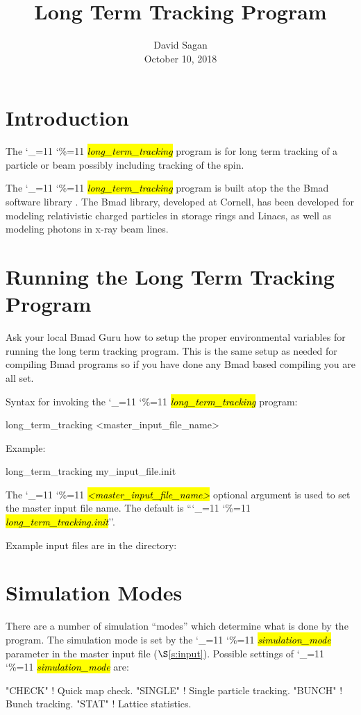 \documentclass{hitec}
\title{Long Term Tracking Program}
\author{}
\date{David Sagan \\ October 10, 2018}
\newcommand\dottcmd[1]{\hl{\em#1}\endgroup}
\newcommand{\vn}{\begingroup\catcode`\_=11 \catcode`\%=11 \dottcmd}
\newcommand{\ltt}{\vn{long_term_tracking}\xspace}
\newcommand{\sref}[1]{$\S$\ref{#1}}
\newcommand{\Section}[1]{\section{#1}\vspace*{-1ex}}
\begin{document}
\maketitle

\tableofcontents


\Section{Introduction} 

The \ltt program is for long term tracking of a particle or beam possibly
including tracking of the spin.

The \ltt program is built atop the the Bmad software library \cite{b:bmad}. The Bmad library,
developed at Cornell, has been developed for modeling relativistic charged particles in storage
rings and Linacs, as well as modeling photons in x-ray beam lines.

\Section{Running the Long Term Tracking Program} 
\label{s:run}

Ask your local Bmad Guru how to setup the proper environmental variables for running the long term
tracking program. This is the same setup as needed for compiling Bmad programs so if you have done
any Bmad based compiling you are all set. 

Syntax for invoking the \ltt program:
\begin{code}
  long_term_tracking {<master_input_file_name>}
\end{code}
Example:
\begin{code}
  long_term_tracking my_input_file.init
\end{code}
The \vn{<master_input_file_name>} optional argument is used to set the master input file name. The
default is ``\vn{long_term_tracking.init}''.

Example input files are in the directory:

\Section{Simulation Modes}
\label{s:sim.modes}

There are a number of simulation ``modes'' which determine what is done by the program. The
simulation mode is set by the \vn{simulation_mode} parameter in the master input file
(\sref{s:input}).  Possible settings of \vn{simulation_mode} are:
\begin{code}
  "CHECK"   ! Quick map check.
  "SINGLE"  ! Single particle tracking.
  "BUNCH"   ! Bunch tracking.
  "STAT"    ! Lattice statistics.
\end{code}
\end{document}

